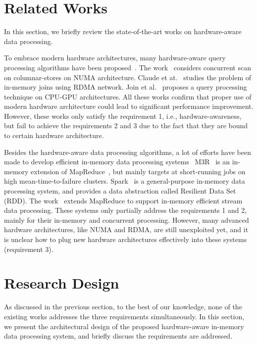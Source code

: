 \documentclass[conference]{llncs}
\begin{document}
\section{Related Works}
\label{sec:related-works}
In this section, we briefly review the state-of-the-art works on hardware-aware data processing.

To embrace modern hardware architectures, many hardware-aware query processing algorithms have been proposed~\cite{scan-numa2015,processing-gpu2015,join2015}.
The work~\cite{scan-numa2015} considers concurrent scan on columnar-stores on NUMA architecture.
Claude et at.~\cite{join2015} studies the problem of in-memory joins using RDMA network.
Join et al.~\cite{processing-gpu2015} proposes a query processing technique on CPU-GPU architectures.
All these works confirm that proper use of modern hardware architecture could lead to significant performance improvement.
However, these works only satisfy the requirement 1, i.e., hardware-awareness, but fail to achieve the requirements 2 and 3 due to the fact that they are bound to certain hardware architecture.

Besides the hardware-aware data processing algorithms, a lot of efforts have been made to develop efficient in-memory data processing systems~\cite{m3r2012,spark2012,platform2011}
M3R~\cite{m3r2012} is an in-memory extension of MapReduce~\cite{mapreduce2008}, but mainly targets at short-running jobs on high mean-time-to-failure clusters.
Spark~\cite{spark2012} is a general-purpose in-memory data processing system, and provides a data abstraction called Resilient Data Set (RDD).
The work~\cite{platform2011} extends MapReduce to support in-memory efficient stream data processing.
These systems only partially address the requirements 1 and 2, mainly for their in-memory and concurrent processing.
However, many advanced hardware architectures, like NUMA and RDMA, are still unexploited yet, and it is unclear how to plug new hardware architectures effectively into these systems (requirement 3).

\section{Research Design}
\label{sec:research-plan}
As discussed in the previous section, to the best of our knowledge, none of the existing works addresses the three requirements simultaneously.
In this section, we present the architectural design of the proposed hardware-aware in-memory data processing system, and briefly discuss the requirements are addressed.
\end{document}
